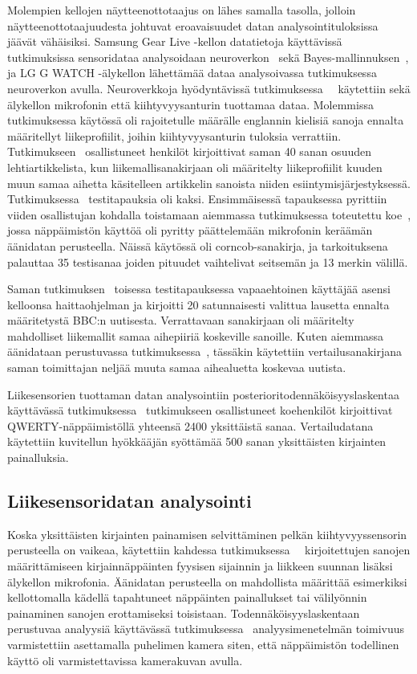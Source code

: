 \documentclass[finnish]{tktltiki2}
\theoremstyle{definition}
\theoremstyle{remark}
\begin{document}
Molempien kellojen näytteenottotaajus on lähes samalla tasolla, jolloin näytteenottotaajuudesta johtuvat eroavaisuudet datan analysointituloksissa jäävät vähäisiksi. Samsung Gear Live -kellon datatietoja käyttävissä tutkimuksissa sensoridataa analysoidaan neuroverkon~\cite{maiti} sekä Bayes-mallinnuksen~\cite{mole}, ja LG G WATCH -älykellon lähettämää dataa analysoivassa tutkimuksessa neuroverkon avulla. Neuroverkkoja hyödyntävissä tutkimuksessa~\cite{maiti}~\cite{liu} käytettiin sekä älykellon mikrofonin että kiihtyvyysanturin tuottamaa dataa. Molemmissa tutkimuksessa käytössä oli rajoitetulle määrälle englannin kielisiä sanoja ennalta määritellyt liikeprofiilit, joihin kiihtyvyysanturin tuloksia verrattiin. Tutkimukseen~\cite{maiti} osallistuneet henkilöt kirjoittivat saman 40 sanan osuuden lehtiartikkelista, kun liikemallisanakirjaan oli määritelty liikeprofiilit kuuden muun samaa aihetta käsitelleen artikkelin sanoista niiden esiintymisjärjestyksessä.
Tutkimuksessa~\cite{liu} testitapauksia oli kaksi. Ensimmäisessä tapauksessa pyrittiin viiden osallistujan kohdalla toistamaan aiemmassa tutkimuksessa toteutettu koe~\cite{berger}, jossa näppäimistön käyttöä oli pyritty päättelemään mikrofonin keräämän äänidatan perusteella. Näissä käytössä oli corncob-sanakirja, ja tarkoituksena palauttaa 35 testisanaa joiden pituudet vaihtelivat seitsemän ja 13 merkin välillä. 

Saman tutkimuksen~\cite{liu} toisessa testitapauksessa vapaaehtoinen käyttäjää asensi kelloonsa haittaohjelman ja kirjoitti 20 satunnaisesti valittua lausetta ennalta määritetystä BBC:n uutisesta. Verrattavaan sanakirjaan oli määritelty mahdolliset liikemallit samaa aihepiiriä koskeville sanoille. Kuten aiemmassa äänidataan perustuvassa tutkimuksessa~\cite{mar}, tässäkin käytettiin vertailusanakirjana saman toimittajan neljää muuta samaa aihealuetta koskevaa uutista. 

Liikesensorien tuottaman datan analysointiin posterioritodennäköisyyslaskentaa käyttävässä tutkimuksessa~\cite{mole} tutkimukseen osallistuneet koehenkilöt kirjoittivat QWERTY-näppäimistöllä yhteensä 2400 yksittäistä sanaa. Vertailudatana käytettiin kuvitellun hyökkääjän syöttämää 500 sanan yksittäisten kirjainten painalluksia.


\subsection{Liikesensoridatan analysointi}
Koska yksittäisten kirjainten painamisen selvittäminen pelkän kiihtyvyyssensorin perusteella on vaikeaa, käytettiin kahdessa tutkimuksessa~\cite{maiti}~\cite{liu} kirjoitettujen sanojen määrittämiseen kirjainnäppäinten fyysisen sijainnin ja liikkeen suunnan lisäksi älykellon mikrofonia. Äänidatan perusteella on mahdollista määrittää esimerkiksi kellottomalla kädellä tapahtuneet näppäinten painallukset tai välilyönnin painaminen sanojen erottamiseksi toisistaan. Todennäköisyyslaskentaan perustuvaa analyysiä käyttävässä tutkimuksessa~\cite{mole} analyysimenetelmän toimivuus varmistettiin asettamalla puhelimen kamera siten, että näppäimistön todellinen käyttö oli varmistettavissa kamerakuvan avulla.
\end{document}
